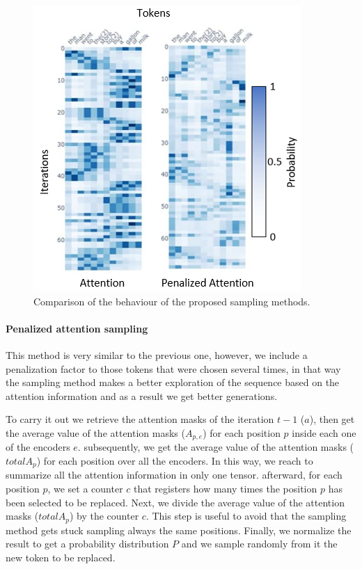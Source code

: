 \documentclass[10pt,twocolumn,letterpaper]{article}
\begin{document}
\begin{figure}
   \centering
   \includegraphics[scale=0.7]{attComp.PNG}
   \caption{Comparison of the behaviour of the proposed sampling methods.}
   \label{fig:AttentComp}
\end{figure}

\paragraph{Penalized attention sampling}
This method is very similar to the previous one, however, we include a penalization factor
to those tokens that were chosen several times, in that way the sampling method makes a better
exploration of the sequence based on the attention information and as a result we get better
generations.

To carry it out we retrieve the attention masks of the iteration $t-1$ ($a$), then get the average value of
the attention masks ($A_{p,e}$) for each position $p$ inside each one of the encoders $e$. subsequently, we get
the average value of the attention masks ($totalA_{p}$) for each position over all the encoders.
In this way, we reach to summarize all the attention information in only one tensor.
afterward, for each position $p$, we set a counter $c$ that registers how many times the position $p$ has been selected to be replaced.
Next, we divide the average value of the attention masks ($totalA_{p}$) by the counter $c$.
This step is useful to avoid that the sampling method gets stuck sampling always the same positions.
Finally, we normalize the result to get a probability distribution $P$ and we sample randomly from it the new token to be replaced.
\end{document}
